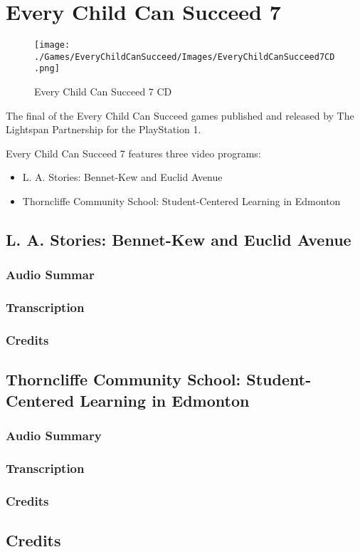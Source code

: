 \chapter{Every Child Can Succeed 7}

\begin{figure}[H]
    \centering
    \texttt{[image: ./Games/EveryChildCanSucceed/Images/EveryChildCanSucceed7CD.png]}
    \caption{Every Child Can Succeed 7 CD}
\end{figure}

The final of the Every Child Can Succeed games published and released by The Lightspan Partnership for the PlayStation 1.

Every Child Can Succeed 7 features three video programs:

\begin{itemize}
    \item L. A. Stories: Bennet-Kew and Euclid Avenue
    \item Thorncliffe Community School: Student-Centered Learning in Edmonton
\end{itemize}

\clearpage
\newpage

\section{L. A. Stories: Bennet-Kew and Euclid Avenue}

\subsection{Audio Summar}

\subsection{Transcription}

\subsection{Credits}

\section{Thorncliffe Community School: Student-Centered Learning in Edmonton}

\subsection{Audio Summary}

\subsection{Transcription}

\subsection{Credits}

\section{Credits}